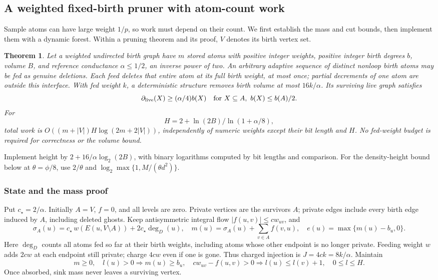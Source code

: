 \documentclass[11pt]{article}
\newtheorem{theorem}{Theorem}[section]
\theoremstyle{remark}
\begin{document}
\subsection{A weighted fixed-birth pruner with atom-count work}
\label{struct27:sec:weighted-pruner}

Sample atoms can have large weight $1/p$, so work must depend on their count.
We first establish the mass and cut bounds, then implement them with a dynamic
forest.
Within a pruning theorem and its proof, $V$ denotes its birth vertex set.

\begin{theorem}\label{struct27:thm:weighted}
Let a weighted undirected birth graph have $m$ stored atoms with positive
integer weights, positive integer birth degrees $b$, volume $B$, and reference
conductance $\alpha\le1/2$, an inverse power of two.
An arbitrary adaptive sequence of distinct nonloop birth atoms may be fed as
genuine deletions.
Each feed deletes that entire atom at its full birth weight, at most once;
partial decrements of one atom are outside this interface.
With fed weight $k$, a deterministic structure removes birth volume at most
$16k/\alpha$.
Its surviving live graph satisfies
\[
 \partial_{\rm live}(X)\ge(\alpha/4)b(X)
 \quad\text{for }X\subseteq A,\ b(X)\le b(A)/2.
\]
For
\[
 H=2+ \ln(2B)/\ln(1+\alpha/8) ,
\]
total work is $O((m+|V|)H\log(2m+2|V|))$, independently of numeric weights
except their bit length and $H$.
No fed-weight budget is required for correctness or the volume bound.
\end{theorem}

Implement height by $2+ 16/\alpha  \log_2(2B) $, with
binary logarithms computed by bit lengths and comparison.
For the density-height bound below at $\theta=\phi/8$, use $2/\theta$ and
$\log_2\max\{1,M/(\theta d^2)\}$.

\subsubsection{State and the mass proof} Put $c_\star=2/\alpha$.
Initially $A=V$, $f=0$, and all levels are zero.
Private vertices are the survivors $A$; private edges include every birth edge
induced by $A$, including deleted ghosts.
Keep antisymmetric integral flow $|f(u,v)|\le cw_{uv}$, and
\begin{equation}\label{struct27:eq:weightedstate}
 \sigma_A(u)=c_\star\,w(E(u,V\setminus A))+2c_\star\deg_D(u),\quad
 m(u)=\sigma_A(u)+\sum_{v\in A}f(v,u),\quad
 e(u)=\max\{m(u)-b_u,0\}.
\end{equation}
Here $\deg_D$ counts all atoms fed so far at their birth weights, including
atoms whose other endpoint is no longer private.
Feeding weight $w$ adds $2cw$ at each endpoint still private; charge $4cw$ even
if one is gone.
Thus charged injection is $J=4ck=8k/\alpha$.
Maintain
\begin{equation}\label{struct27:eq:flowinvariants}
 m\ge0,\quad l(u)>0\Longrightarrow m(u)\ge b_u,\quad
 cw_{uv}-f(u,v)>0\Longrightarrow l(u)\le l(v)+1,
 \quad 0\le l\le H.
\end{equation}
Once absorbed, sink mass never leaves a surviving vertex.
\end{document}

